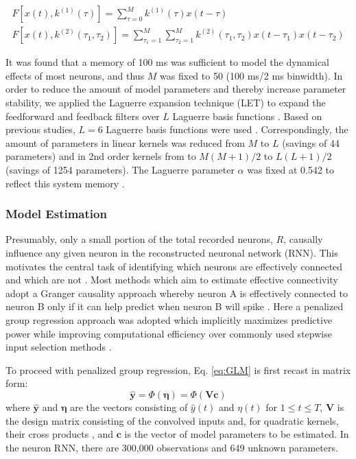 \documentclass[11pt,a4paper,final]{article}
\begin{document}
\begin{subequations}
	\begin{align}
	F[x(t),k^{(1)}(\tau)]=\sum_{\tau=0}^{M}k^{(1)}(\tau)x(t-\tau)\\
	F[x(t),k^{(2)}(\tau_1,\tau_2)]=\sum_{\tau_1=1}^M\sum_{\tau_2=1}^Mk^{(2)}(\tau_1,\tau_2)x(t-\tau_1)x(t-\tau_2)
	\end{align}
	\label{eq:FF}
\end{subequations}

It was found that a memory of 100 ms was sufficient to model the dynamical effects of most neurons, and thus $M$ was fixed to 50 (100 ms/2 ms binwidth).
In order to reduce the amount of model parameters and thereby increase parameter stability, we applied the Laguerre expansion technique (LET) to expand the feedforward and feedback filters over $L$ Laguerre basis functions \citep{marm04}.
Based on previous studies, $L=6$ Laguerre basis functions were used \citep{sandler15clpp,song07,song09}.
Correspondingly, the amount of parameters in linear kernels was reduced from $M$ to $L$ (savings of 44 parameters) and in 2nd order kernels from to $M(M+1)/2$ to $L(L+1)/2$ (savings of 1254 parameters).
The Laguerre parameter $\alpha$ was fixed at 0.542 to reflect this system memory \citep{marm04}.


\subsubsection{Model Estimation \label{MtE}}
Presumably, only a small portion of the total recorded neurons, $R$, causally influence any given neuron in the reconstructed neuronal network (RNN).
This motivates the central task of identifying which neurons are effectively connected and which are not \citep{sporns09,fallani14}.
Most methods which aim to estimate effective connectivity adopt a Granger causality approach whereby neuron A is effectively connected to neuron B only if it can help predict when neuron B will spike \citep{shoham10,brown11,sandler14,zhou14}.
Here a penalized group regression approach was adopted which implicitly maximizes predictive power while improving computational efficiency over commonly used stepwise input selection methods \citep{song13sparse,song16sparse}.

To proceed with penalized group regression, Eq. \ref{eq:GLM} is first recast in matrix form:
\begin{equation}
\bm{\hat{y}}=\Phi(\bm{\eta})=\Phi(\bm{Vc})
\label{eq:mat}
\end{equation}
where $\bm{\hat{y}}$ and $\bm{\eta}$ are the vectors consisting of $\hat{y}(t)$ and $\eta(t)$ for $1\leq t \leq T$, $\bm{V}$ is the design matrix consisting of the convolved inputs and, for quadratic kernels, their cross products \citep{marm04}, and  $\bm{c}$ is the vector of model parameters to be estimated.
In the \nn{} neuron RNN, there are 300,000 observations and 649 unknown parameters.
\end{document}
